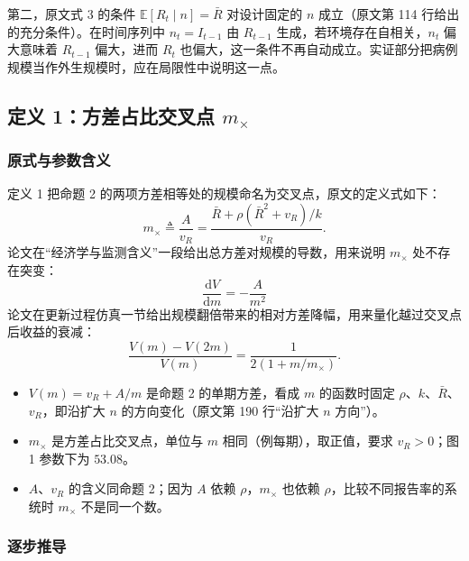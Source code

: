 第二，原文式 3 的条件 $\mathbb{E}[R_t\mid n]=\bar R$ 对设计固定的 $n$ 成立（原文第 114 行给出的充分条件）。在时间序列中 $n_t=I_{t-1}$ 由 $R_{t-1}$ 生成，若环境存在自相关，$n_t$ 偏大意味着 $R_{t-1}$ 偏大，进而 $R_t$ 也偏大，这一条件不再自动成立。实证部分把病例规模当作外生规模时，应在局限性中说明这一点。

\subsection{定义 1：方差占比交叉点 $m_\times$}

\subsubsection{原式与参数含义}

定义 1 把命题 2 的两项方差相等处的规模命名为交叉点，原文的定义式如下：
\begin{equation*}
m_\times \triangleq \frac{A}{v_R} = \frac{\bar{R} + \rho(\bar{R}^2 + v_R)/k}{v_R}.
\tag{原文式 9}
\end{equation*}
论文在“经济学与监测含义”一段给出总方差对规模的导数，用来说明 $m_\times$ 处不存在突变：
\begin{equation*}
\frac{\mathrm{d}V}{\mathrm{d}m} = -\frac{A}{m^2}
\tag*{原文第 190 行}
\end{equation*}
论文在更新过程仿真一节给出规模翻倍带来的相对方差降幅，用来量化越过交叉点后收益的衰减：
\begin{equation*}
\frac{V(m) - V(2m)}{V(m)} = \frac{1}{2(1 + m/m_\times)}.
\tag{原文式 29}
\end{equation*}

\begin{itemize}
\item $V(m)=v_R+A/m$ 是命题 2 的单期方差，看成 $m$ 的函数时固定 $\rho$、$k$、$\bar R$、$v_R$，即沿扩大 $n$ 的方向变化（原文第 190 行“沿扩大 $n$ 方向”）。
\item $m_\times$ 是方差占比交叉点，单位与 $m$ 相同（例每期），取正值，要求 $v_R>0$；图 1 参数下为 $53.08$。
\item $A$、$v_R$ 的含义同命题 2；因为 $A$ 依赖 $\rho$，$m_\times$ 也依赖 $\rho$，比较不同报告率的系统时 $m_\times$ 不是同一个数。
\end{itemize}

\subsubsection{逐步推导}

